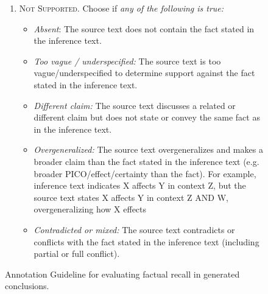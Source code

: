 \documentclass{article}
\begin{document}
\begin{figure}[t]
\begin{small}
\begin{tcolorbox}[colback=gray!5, colframe=black, width=\textwidth, title=\textbf{Annotation Guideline for Evaluating Factual Recall}, fonttitle=\bfseries]
\begin{enumerate}[leftmargin=0.6cm]
    \item \textsc{Not Supported.} Choose if \textit{any of the following is true:}
    \vspace{-0.2em}
    \begin{itemize}[leftmargin=0.5cm]
    \item \textit{Absent}: The source text does not contain the fact stated in the inference text.
    \item \textit{Too vague / underspecified:} The source text is too vague/underspecified to determine support against the fact stated in the inference text.
    \item \textit{Different claim:} The source text discusses a related or different claim but does not state or convey the same fact as in the inference text.
    \item \textit{Overgeneralized:} The source text overgeneralizes and makes a broader claim than the fact stated in the inference text (e.g. broader PICO/effect/certainty than the fact). For example, inference text indicates X affects Y in context Z, but the source text states X affects Y in context Z AND W, overgeneralizing how X effects
    \item \textit{Contradicted or mixed:} The source text contradicts or conflicts with the fact stated in the inference text (including partial or full conflict).
    \end{itemize}

\end{enumerate}
\end{tcolorbox}
\caption{Annotation Guideline for evaluating factual recall in generated conclusions.}
\label{fig:annotation_guidelines-fact-recall}
\end{small}
\end{figure}

\clearpage
\end{document}
